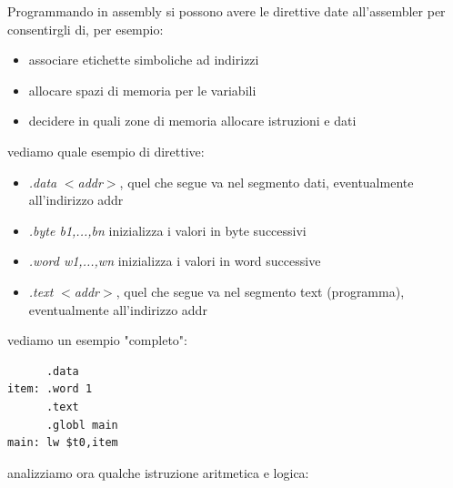 \documentclass[a4paper,12pt, oneside]{book}
\begin{document}
\newpage
Programmando in assembly si possono avere le direttive date all'assembler per consentirgli di, per esempio:
\begin{itemize}
  \item associare etichette simboliche ad indirizzi
  \item allocare spazi di memoria per le variabili
  \item decidere in quali zone di memoria allocare istruzioni e dati
\end{itemize}
vediamo quale esempio di direttive:
\begin{itemize}
  \item \textit{.data} $<$\textit{addr}$>$, quel che segue va nel segmento dati, eventualmente all'indirizzo addr
  \item \textit{.byte b1,...,bn} inizializza i valori in byte successivi
  \item \textit{.word w1,...,wn} inizializza i valori in word successive
  \item \textit{.text} $<$\textit{addr}$>$, quel che segue va nel segmento text (programma), eventualmente all'indirizzo addr
\end{itemize}
vediamo un esempio "completo":
\begin{verbatim}
      .data
item: .word 1
      .text
      .globl main
main: lw $t0,item
\end{verbatim}
analizziamo ora qualche istruzione aritmetica e logica:
\end{document}
